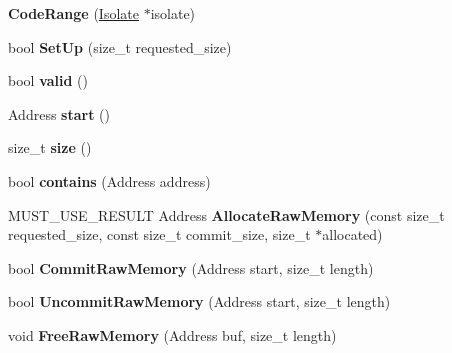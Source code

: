 \begin{DoxyCompactItemize}
\item 
{\bfseries Code\+Range} (\hyperlink{classv8_1_1internal_1_1_isolate}{Isolate} $\ast$isolate)\hypertarget{classv8_1_1internal_1_1_code_range_a2da59ac7ea807e47ff203a3ec0819f22}{}\label{classv8_1_1internal_1_1_code_range_a2da59ac7ea807e47ff203a3ec0819f22}

\item 
bool {\bfseries Set\+Up} (size\+\_\+t requested\+\_\+size)\hypertarget{classv8_1_1internal_1_1_code_range_ab1082d1ad9b6ce86a731ab6361d2c8c2}{}\label{classv8_1_1internal_1_1_code_range_ab1082d1ad9b6ce86a731ab6361d2c8c2}

\item 
bool {\bfseries valid} ()\hypertarget{classv8_1_1internal_1_1_code_range_afadcd51c16f631264936da438f1d6cc9}{}\label{classv8_1_1internal_1_1_code_range_afadcd51c16f631264936da438f1d6cc9}

\item 
Address {\bfseries start} ()\hypertarget{classv8_1_1internal_1_1_code_range_a7a5983aaf6d9d12992fc769650f15423}{}\label{classv8_1_1internal_1_1_code_range_a7a5983aaf6d9d12992fc769650f15423}

\item 
size\+\_\+t {\bfseries size} ()\hypertarget{classv8_1_1internal_1_1_code_range_a4697153e507a7535167fb4020ea3b7fe}{}\label{classv8_1_1internal_1_1_code_range_a4697153e507a7535167fb4020ea3b7fe}

\item 
bool {\bfseries contains} (Address address)\hypertarget{classv8_1_1internal_1_1_code_range_a02dc5af7ad63aee79f0b772b255d7e09}{}\label{classv8_1_1internal_1_1_code_range_a02dc5af7ad63aee79f0b772b255d7e09}

\item 
M\+U\+S\+T\+\_\+\+U\+S\+E\+\_\+\+R\+E\+S\+U\+LT Address {\bfseries Allocate\+Raw\+Memory} (const size\+\_\+t requested\+\_\+size, const size\+\_\+t commit\+\_\+size, size\+\_\+t $\ast$allocated)\hypertarget{classv8_1_1internal_1_1_code_range_ab770d600d0f42aa2834a5968fa812942}{}\label{classv8_1_1internal_1_1_code_range_ab770d600d0f42aa2834a5968fa812942}

\item 
bool {\bfseries Commit\+Raw\+Memory} (Address start, size\+\_\+t length)\hypertarget{classv8_1_1internal_1_1_code_range_ac52f5532656c5e6aa6a8750dd5dadd5d}{}\label{classv8_1_1internal_1_1_code_range_ac52f5532656c5e6aa6a8750dd5dadd5d}

\item 
bool {\bfseries Uncommit\+Raw\+Memory} (Address start, size\+\_\+t length)\hypertarget{classv8_1_1internal_1_1_code_range_aee7c86999c6002cd2ce3004ab1ffc5c7}{}\label{classv8_1_1internal_1_1_code_range_aee7c86999c6002cd2ce3004ab1ffc5c7}

\item 
void {\bfseries Free\+Raw\+Memory} (Address buf, size\+\_\+t length)\hypertarget{classv8_1_1internal_1_1_code_range_a1dbd30c12efca7e40cc0612e81515821}{}\label{classv8_1_1internal_1_1_code_range_a1dbd30c12efca7e40cc0612e81515821}

\end{DoxyCompactItemize}

